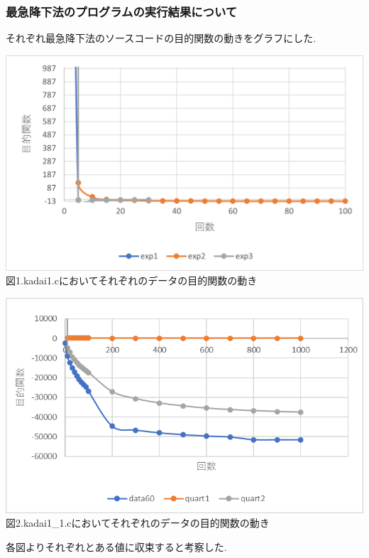 \documentclass[12pt]{jarticle}
\begin{document}
\subsubsection{最急降下法のプログラムの実行結果について}
それぞれ最急降下法のソースコードの目的関数の動きをグラフにした.
\begin{center}
    \includegraphics[width=15cm,clip]{1.png}\\
    図1.kadai1.cにおいてそれぞれのデータの目的関数の動き\\
\end{center}
\begin{center}
    \includegraphics[width=15cm,clip]{2.png}\\
    図2.kadai1\_1.cにおいてそれぞれのデータの目的関数の動き\\
\end{center}
各図よりそれぞれとある値に収束すると考察した.\\
\end{document}
